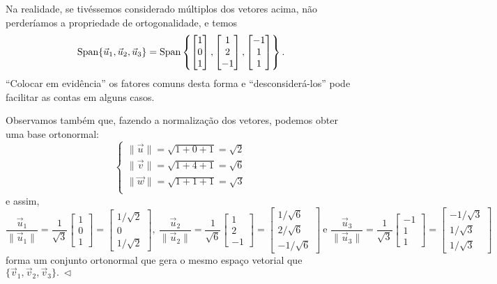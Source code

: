 \documentclass[../livro.tex]{subfiles}  %
\begin{document}
\begin{example}
Na realidade, se tivéssemos considerado múltiplos dos vetores acima, não perderíamos a propriedade de ortogonalidade, e temos
\[
\operatorname{Span} \{ \vec{u}_1, \vec{u}_2, \vec{u}_3 \} =
\operatorname{Span} \left\{
\begin{bmatrix}
1 \\ 0 \\ 1
\end{bmatrix},
\begin{bmatrix}
1 \\ 2 \\ -1
\end{bmatrix},
\begin{bmatrix}
-1 \\ 1 \\ 1
\end{bmatrix}
\right\}.
\] ``Colocar em evidência'' os fatores comuns desta forma e ``desconsiderá-los'' pode facilitar as contas em alguns casos.

Observamos também que, fazendo a normalização dos vetores, podemos obter uma base ortonormal:
\[
\left\{
  \begin{array}{ll}
   \|\vec{u}\| = \sqrt{1 + 0 + 1} = \sqrt{2} \\
   \|\vec{v}\| = \sqrt{1 + 4 + 1} = \sqrt{6} \\
   \|\vec{w}\| = \sqrt{1 + 1 + 1} = \sqrt{3} \\
  \end{array}
\right.
\] e assim,
\[
\frac{\vec{u}_1}{\|\vec{u}_1\|} = \frac{1}{\sqrt{3}}
\begin{bmatrix}
1 \\ 0 \\ 1
\end{bmatrix} =
\begin{bmatrix}
1/\sqrt{2} \\ 0 \\ 1/\sqrt{2}
\end{bmatrix}, \
\frac{\vec{u}_2}{\|\vec{u}_2\|} = \frac{1}{\sqrt{6}}
\begin{bmatrix}
1 \\ 2 \\ -1
\end{bmatrix} =
\begin{bmatrix}
1/\sqrt{6} \\ 2/\sqrt{6} \\ -1/\sqrt{6}
\end{bmatrix} \ \text{e }
\frac{\vec{u}_3}{\|\vec{u}_3\|} = \frac{1}{\sqrt{3}}
\begin{bmatrix}
-1 \\ 1 \\ 1
\end{bmatrix} =
\begin{bmatrix}
-1/\sqrt{3} \\ 1/\sqrt{3} \\ 1/\sqrt{3}
\end{bmatrix}
\] forma um conjunto ortonormal que gera o mesmo espaço vetorial que $\{ \vec{v}_1, \vec{v}_2, \vec{v}_3 \}. \ \lhd$
\end{example}
\end{document}

